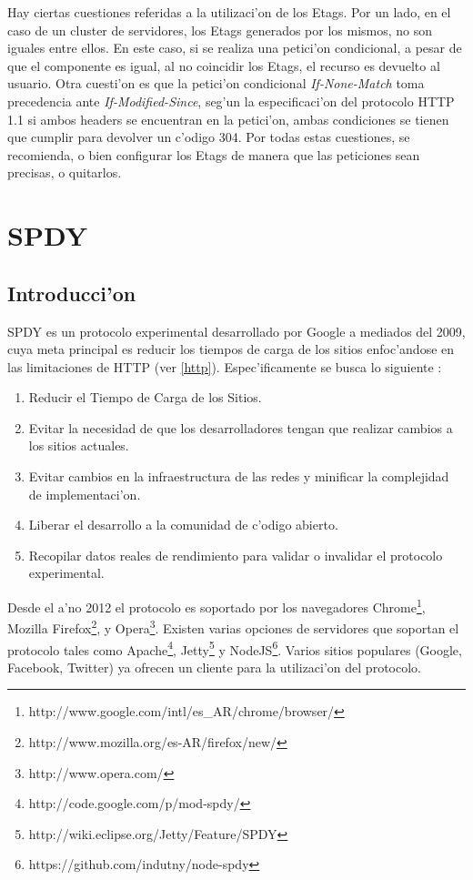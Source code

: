 \begin{enumerate}
Hay ciertas cuestiones referidas a la utilizaci'on de los Etags. Por un lado, en el caso de un cluster de servidores, los Etags generados por los mismos, no son iguales entre ellos. En este caso, si se realiza una petici'on condicional, a pesar de que el componente es igual, al no coincidir los Etags, el recurso es devuelto al usuario. Otra cuesti'on es que la petici'on condicional \textit{If-None-Match} toma precedencia ante \textit{If-Modified-Since}, seg'un la especificaci'on del protocolo HTTP 1.1 si ambos headers se encuentran en la petici'on, ambas condiciones se tienen que cumplir para devolver un c'odigo 304. Por todas estas cuestiones, se recomienda, o bien configurar los Etags de manera que las peticiones sean precisas, o quitarlos.

\end{enumerate}

\section{SPDY}
\label{spdy}

\subsection{Introducci'on}

SPDY es un protocolo experimental desarrollado por Google a mediados del 2009, cuya meta principal es reducir los tiempos de carga de los sitios enfoc'andose en las limitaciones de HTTP (ver \ref{http}).
Espec'ificamente se busca lo siguiente \citep{highPerformance}:
\begin{enumerate}
\item Reducir el Tiempo de Carga de los Sitios.
\item Evitar la necesidad de que los desarrolladores tengan que realizar cambios a los sitios actuales.
\item Evitar cambios en la infraestructura de las redes y minificar la complejidad de implementaci'on.
\item Liberar el desarrollo a la comunidad de c'odigo abierto.
\item Recopilar datos reales de rendimiento para validar o invalidar el protocolo experimental.
\end{enumerate}
Desde el a'no 2012 el protocolo es soportado por los navegadores Chrome\footnote{http://www.google.com/intl/es\_AR/chrome/browser/}, Mozilla Firefox\footnote{http://www.mozilla.org/es-AR/firefox/new/}, y Opera\footnote{http://www.opera.com/}. Existen varias opciones de servidores que soportan el protocolo tales como Apache\footnote{http://code.google.com/p/mod-spdy/}, Jetty\footnote{http://wiki.eclipse.org/Jetty/Feature/SPDY} y NodeJS\footnote{https://github.com/indutny/node-spdy}. Varios sitios populares (Google, Facebook, Twitter) ya ofrecen un cliente para la utilizaci'on del protocolo. 

